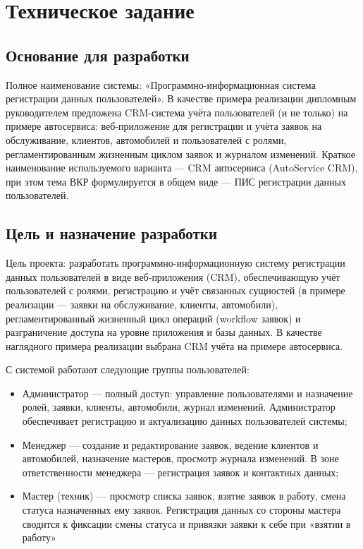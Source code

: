 \section{Техническое задание}
\subsection{Основание для разработки}

Полное наименование системы:  «Программно-информационная система регистрации данных пользователей». В качестве примера реализации дипломным руководителем предложена CRM-система учёта пользователей (и не только) на примере автосервиса: веб-приложение для регистрации и учёта заявок на обслуживание, клиентов, автомобилей и пользователей с ролями, регламентированным жизненным циклом заявок и журналом изменений. Краткое наименование используемого варианта — CRM автосервиса (AutoService CRM), при этом тема ВКР формулируется в общем виде — ПИС регистрации данных пользователей.


\subsection{Цель и назначение разработки}

Цель проекта: разработать программно-информационную систему регистрации данных пользователей в виде веб-приложения (CRM), обеспечивающую учёт пользователей с ролями, регистрацию и учёт связанных сущностей (в примере реализации — заявки на обслуживание, клиенты, автомобили), регламентированный жизненный цикл операций (workflow заявок) и разграничение доступа на уровне приложения и базы данных. В качестве наглядного примера реализации выбрана CRM учёта на примере автосервиса.

С системой работают следующие группы пользователей:

\begin{itemize}
\item Администратор — полный доступ: управление пользователями и назначение ролей, заявки, клиенты, автомобили, журнал изменений. Администратор обеспечивает регистрацию и актуализацию данных пользователей системы;
\item Менеджер — создание и редактирование заявок, ведение клиентов и автомобилей, назначение мастеров, просмотр журнала изменений. В зоне ответственности менеджера — регистрация заявок и контактных данных;
\item Мастер (техник) — просмотр списка заявок, взятие заявок в работу, смена статуса назначенных ему заявок. Регистрация данных со стороны мастера сводится к фиксации смены статуса и привязки заявки к себе при «взятии в работу»
\end{itemize}

